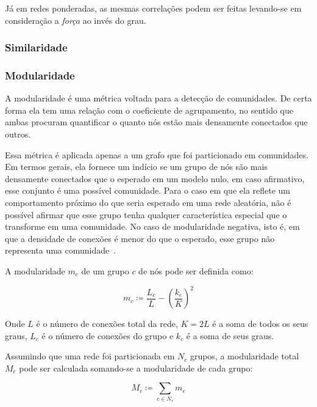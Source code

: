 \documentclass[12pt,a4paper]{article}
\theoremstyle{hypo}
\newcommand{\defn}{\coloneqq} %
\begin{document}
Já em redes ponderadas, as mesmas correlações podem ser feitas levando-se em consideração a \textit{força} ao invés do grau.

\subsubsection{Similaridade}

\subsubsection{Modularidade} \label{sec:modularidade}

A modularidade é uma métrica voltada para a detecção de comunidades. De certa forma ela tem uma relação com o coeficiente de agrupamento, no sentido que ambas procuram quantificar o quanto nós estão mais densamente conectados que outros.

Essa métrica é aplicada apenas a um grafo que foi particionado em comunidades. Em termos gerais, ela fornece um indício se um grupo de nós são mais densamente conectados que o esperado em um modelo nulo, em caso afirmativo, esse conjunto é uma possível comunidade. Para o caso em que ela reflete um comportamento próximo do que seria esperado em uma rede aleatória, não é possível afirmar que esse grupo tenha qualquer característica especial que o transforme em uma comunidade. No caso de modularidade negativa, isto é, em que a densidade de conexões é menor do que o esperado, esse grupo não representa uma comunidade~\cite{Barabasi2016-rn}.

A modularidade $m_c$ de um grupo $c$ de nós pode ser definida como:

\begin{equation} \label{eq:modularidade-local}
m_c \defn \frac{L_c}{L} - \left( \frac{k_c}{K} \right)^2
\end{equation}

Onde $L$ é o número de conexões total da rede, $K = 2L$ é a soma de todos os seus graus, $L_c$ é o número de conexões do grupo e $k_c$ é a soma de seus graus.

Assumindo que uma rede foi particionada em $N_c$ grupos, a modularidade total $M_c$ pode ser calculada somando-se a modularidade de cada grupo:

\begin{equation} \label{eq:modularidade-global}
M_c \defn \sum_{c \in N_c} m_c
\end{equation}
\end{document}
